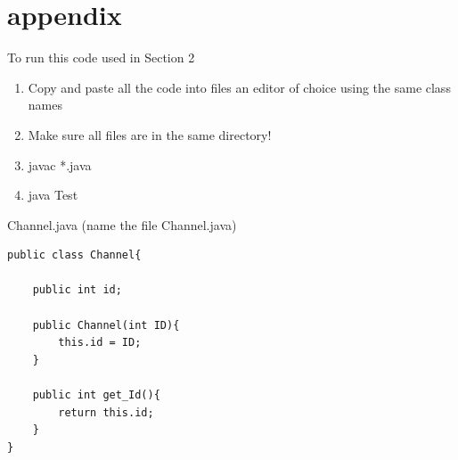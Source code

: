 \documentclass{article}
\begin{document}
\newpage
\section{appendix}
To run this code used in Section 2 
\begin{enumerate}[1. ]
    \item Copy and paste all the code into files an editor of choice using the same class names
    \item Make sure all files are in the same directory!
    \item javac *.java
    \item java Test
\end{enumerate}

Channel.java (name the file Channel.java)
\begin{lstlisting}
public class Channel{

    public int id;

    public Channel(int ID){
        this.id = ID;
    }

    public int get_Id(){
        return this.id;
    }
}
\end{lstlisting}
\end{document}

